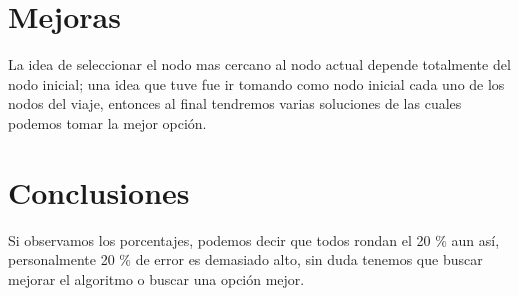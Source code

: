 \documentclass[12pt,a4paper]{article}
\begin{document}
\section{Mejoras}
La idea de seleccionar el nodo mas cercano al nodo actual depende totalmente del nodo inicial; una idea que tuve fue ir tomando como nodo inicial cada uno de los nodos del viaje, entonces al final tendremos varias soluciones de las cuales podemos tomar la mejor opción.
\section{Conclusiones} 
Si observamos los porcentajes, podemos decir que todos rondan el 20 \% aun así, personalmente 20 \% de error es demasiado alto, sin duda tenemos que buscar mejorar el algoritmo o buscar una opción mejor.
\newpage %

\end{document}
